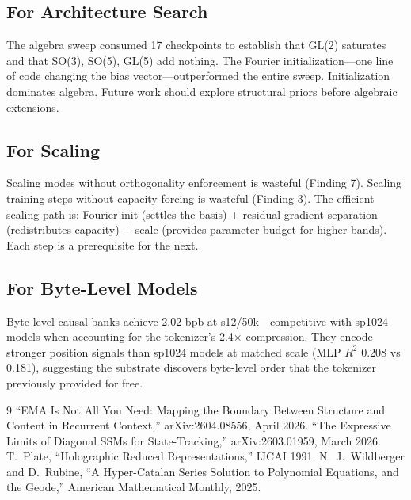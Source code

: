 \documentclass[11pt,a4paper]{article}
\begin{document}
\subsection{For Architecture Search}

The algebra sweep consumed 17 checkpoints to establish that GL(2) saturates and that SO(3), SO(5), GL(5) add nothing. The Fourier initialization---one line of code changing the bias vector---outperformed the entire sweep. Initialization dominates algebra. Future work should explore structural priors before algebraic extensions.

\subsection{For Scaling}

Scaling modes without orthogonality enforcement is wasteful (Finding 7). Scaling training steps without capacity forcing is wasteful (Finding 3). The efficient scaling path is: Fourier init (settles the basis) + residual gradient separation (redistributes capacity) + scale (provides parameter budget for higher bands). Each step is a prerequisite for the next.

\subsection{For Byte-Level Models}

Byte-level causal banks achieve 2.02 bpb at s12/50k---competitive with sp1024 models when accounting for the tokenizer's 2.4$\times$ compression. They encode stronger position signals than sp1024 models at matched scale (MLP $R^2$ 0.208 vs 0.181), suggesting the substrate discovers byte-level order that the tokenizer previously provided for free.

\begin{thebibliography}{9}
 ``EMA Is Not All You Need: Mapping the Boundary Between Structure and Content in Recurrent Context,'' arXiv:2604.08556, April 2026.
 ``The Expressive Limits of Diagonal SSMs for State-Tracking,'' arXiv:2603.01959, March 2026.
 T.~Plate, ``Holographic Reduced Representations,'' IJCAI 1991.
 N.~J.~Wildberger and D.~Rubine, ``A Hyper-Catalan Series Solution to Polynomial Equations, and the Geode,'' American Mathematical Monthly, 2025.
\end{thebibliography}
\end{document}
